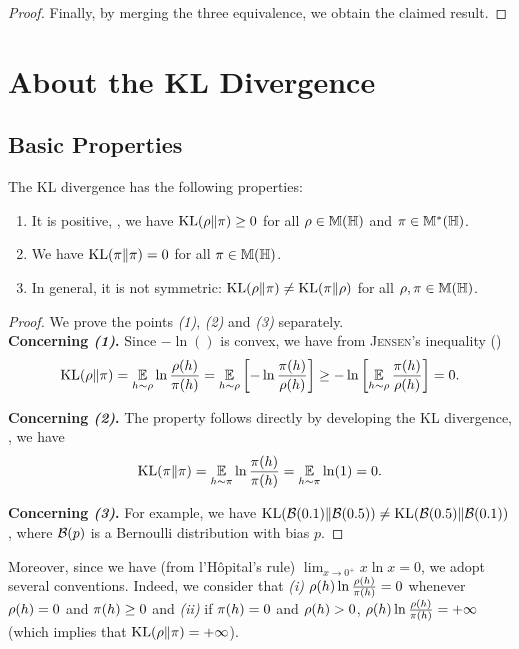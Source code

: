 \begin{noaddcontents}
\begin{proof}
Finally, by merging the three equivalence, we obtain the claimed result.
\end{proof}

\section{About the KL Divergence}
\label{ap:pac-bayes:sec:kl}

\subsection{Basic Properties}

The KL divergence has the following properties:
\begin{enumerate}[label={\it (\arabic*)}]
    \item It is positive, \ie, we have $\operatorname{KL}(\rho\|\pi) \ge 0$ for all $\rho\in\mathbb{M}(\mathbb{H})$ and $\pi \in \mathbb{M}^{*}(\mathbb{H})$.
    \item We have $\operatorname{KL}(\pi\|\pi) = 0$ for all $\pi\in\mathbb{M}(\mathbb{H})$.
    \item In general, it is not symmetric: $\operatorname{KL}(\rho\|\pi) \ne \operatorname{KL}(\pi\|\rho)$ for all $\rho,\pi \in \mathbb{M}(\mathbb{H})$.
\end{enumerate}
\begin{proof} We prove the points {\it (1)}, {\it (2)} and {\it (3)} separately.\\
\textbf{Concerning {\it (1)}.} Since $-\ln()$ is convex, we have from \textsc{Jensen}'s inequality ()
\begin{align*}
    \operatorname{KL}(\rho\|\pi) = \operatorname*{\mathbb{E}}_{h\sim\rho}\ln\frac{\rho(h)}{\pi(h)} = \operatorname*{\mathbb{E}}_{h\sim\rho}\left[-\ln\frac{\pi(h)}{\rho(h)}\right] \ge  -\ln\left[\operatorname*{\mathbb{E}}_{h\sim\rho}\frac{\pi(h)}{\rho(h)}\right] = 0.
\end{align*}

\textbf{Concerning {\it (2)}.} The property follows directly by developing the KL divergence, \ie, we have  
\begin{align*}
    \operatorname{KL}(\pi\|\pi) = \operatorname*{\mathbb{E}}_{h\sim\pi}\ln\frac{\pi(h)}{\pi(h)} = \operatorname*{\mathbb{E}}_{h\sim\pi} \ln(1)  = 0.
\end{align*}

\textbf{Concerning {\it (3)}.} For example, we have $\operatorname{KL}(\mathcal{B}(0.1)\|\mathcal{B}(0.5)) \ne \operatorname{KL}(\mathcal{B}(0.5)\|\mathcal{B}(0.1))$, where $\mathcal{B}(p)$ is a Bernoulli distribution with bias $p$.
\end{proof}

Moreover, since we have (from l'Hôpital's rule) $\lim_{x\rightarrow 0^+} x\ln x = 0$, we adopt several conventions. 
Indeed, we consider that {\it (i)} $\rho(h)\ln\frac{\rho(h)}{\pi(h)}=0$ whenever $\rho(h)=0$ and $\pi(h)\ge 0$ and {\it (ii)} if $\pi(h)=0$ and $\rho(h)>0$, $\rho(h)\ln\frac{\rho(h)}{\pi(h)}=+\infty$ (which implies that $\operatorname{KL}(\rho\|\pi)=+\infty$).



\end{noaddcontents}
